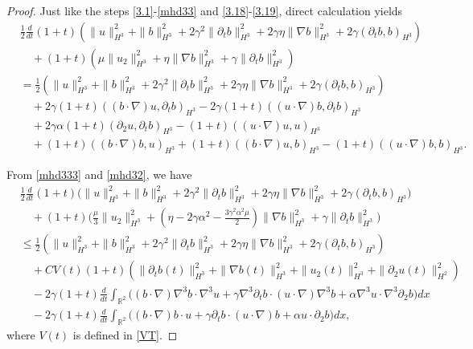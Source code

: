 \documentclass[reqno,11pt]{amsart}
\def\R{\mathbb R}
\numberwithin{Thm}{section}
\begin{document}
\begin{proof}
Just like the steps \eqref{3.1}-\eqref{mhd33} and \eqref{3.18}-\eqref{3.19}, direct calculation yields
\begin{align}\label{E1-1}
&\frac{1}{2}\frac{d}{dt}(1+t)\left(\|u\|^2_{H^3}+\| b\|^2_{H^3}+2\gamma^2\|\partial_tb\|^2_{H^3}
+2\gamma\eta\|\nabla b\|^2_{H^3}+2\gamma(\partial_tb,b)_{H^3}
\right)\nonumber\\
&\quad+(1+t)\left(\mu\|u_2\|^2_{H^3}+\eta\|\nabla b\|^2_{H^3}+\gamma\|\partial_tb\|^2_{H^3}\right)\nonumber\\
&=\frac{1}{2}\left(\|u\|^2_{H^3}+\| b\|^2_{H^3}+2\gamma^2\|\partial_tb\|^2_{H^3}
+2\gamma\eta\|\nabla b\|^2_{H^3}+2\gamma(\partial_t b,b)_{H^3}
\right)\nonumber\\
&\quad+2\gamma(1+t)((b\cdot\nabla) u,\partial_tb)_{H^3} -2\gamma(1+t)((u\cdot\nabla) b,\partial_t b)_{H^3}\nonumber\\
&\quad+2\gamma\alpha(1+t)(\partial_2u,\partial_tb)_{H^3}-(1+t)((u\cdot\nabla) u,u)_{H^3}\nonumber\\
&\quad+(1+t)((b\cdot\nabla) b,u)_{H^3} +(1+t)((b\cdot\nabla) u,b)_{H^3}-(1+t)((u\cdot \nabla) b,b)_{H^3}.
\end{align}



From \eqref{mhd333} and \eqref{mhd32}, we have
\begin{align}\label{E1-2}
&\frac{1}{2}\frac{d}{dt}(1+t)\Big(\|u\|^2_{H^3}+\| b\|^2_{H^3}+2\gamma^2\|\partial_tb\|^2_{H^3}
+2\gamma\eta\|\nabla b\|^2_{H^3}+2\gamma(\partial_tb,b)_{H^3}\Big)\nonumber\\
&\quad+(1+t)\big(\frac{\mu}{3}\|u_2\|^2_{H^3}+(\eta-2\gamma\alpha^2-\frac{3\gamma^2\alpha^2\mu}{2})\|\nabla b\|^2_{H^3}+\gamma\|\partial_{t}b\|^2_{H^3}\big)\nonumber\\
& \leq
\frac{1}{2}\left(\|u\|^2_{H^3}+\| b\|^2_{H^3}+2\gamma^2\|\partial_tb\|^2_{H^3}
+2\gamma\eta\|\nabla b\|^2_{H^3}+2\gamma(\partial_t b,b)_{H^3}
\right)\nonumber\\
&\quad+CV(t)(1+t)\left(\|\partial_{t} b(t)\|_{H^3}^2+\|\nabla b(t)\|_{H^3}^2+\|u_2(t)\|_{H^3}^2+\|\partial_{2}u(t)\|_{H^2}^2\right)\nonumber\\&\quad-2\gamma(1+t)\frac{d}{dt}\int_{\R^2}\big((b\cdot\nabla)\nabla^3 b\cdot\nabla^3 u+\gamma\nabla^3\partial_{t}b\cdot (u\cdot\nabla)\nabla^3 b+\alpha\nabla^3u\cdot\nabla^3\partial_2 b\big)dx\nonumber\\
&\quad-2\gamma(1+t)\frac{d}{dt}\int_{\R^2}\big((b\cdot\nabla) b\cdot u+\gamma\partial_{t}b\cdot (u\cdot\nabla) b+\alpha u\cdot\partial_2 b\big)dx,
\end{align}
where $V(t)$ is defined in \eqref{VT}.



\end{proof}
\end{document}
